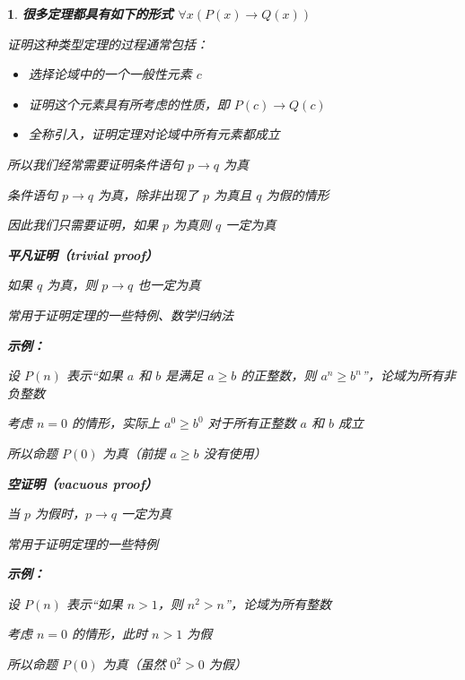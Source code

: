 \documentclass[UTF8]{report}
\theoremstyle{MyLineTheoremStyle} %
\theoremstyle{MyBlockTheoremStyle} %
\theoremstyle{MySubsubsectionStyle} %
\newtheorem{definition}{}
\begin{document}
\begin{definition}
    \textbf{很多定理都具有如下的形式 $\forall x (P(x) \rightarrow Q(x))$}\par
    证明这种类型定理的过程通常包括：\par
    \begin{itemize}
        \item 选择论域中的一个一般性元素 $c$
        \item 证明这个元素具有所考虑的性质，即 $P(c) \rightarrow Q(c)$
        \item 全称引入，证明定理对论域中所有元素都成立\par
    \end{itemize}
    所以我们经常需要证明条件语句 $p \rightarrow q$ 为真\par
    条件语句 $p \rightarrow q$ 为真，除非出现了 $p$ 为真且 $q$ 为假的情形\par
    因此我们只需要证明，如果 $p$ 为真则 $q$ 一定为真\par
\vspace{1em} %
    \textbf{平凡证明（trivial proof）}\par
    如果 $q$ 为真，则 $p \rightarrow q$ 也一定为真\par
    常用于证明定理的一些特例、数学归纳法\par
\vspace{1em} %
    \textbf{示例：}\par
    设 $P(n)$ 表示“如果 $a$ 和 $b$ 是满足 $a \geq b$ 的正整数，则 $a^n \geq b^n$”，论域为所有非负整数\par
    考虑 $n = 0$ 的情形，实际上 $a^0 \geq b^0$ 对于所有正整数 $a$ 和 $b$ 成立\par
    所以命题 $P(0)$ 为真（前提 $a \geq b$ 没有使用）\par
\vspace{1em}
    \textbf{空证明（vacuous proof）}\par
    当 $p$ 为假时，$p \rightarrow q$ 一定为真\par
    常用于证明定理的一些特例\par
\vspace{1em}
    \textbf{示例：}\par
    设 $P(n)$ 表示“如果 $n > 1$，则 $n^2 > n$”，论域为所有整数\par
    考虑 $n = 0$ 的情形，此时 $n > 1$ 为假\par
    所以命题 $P(0)$ 为真（虽然 $0^2 > 0$ 为假）\par
\end{definition}
\end{document}
